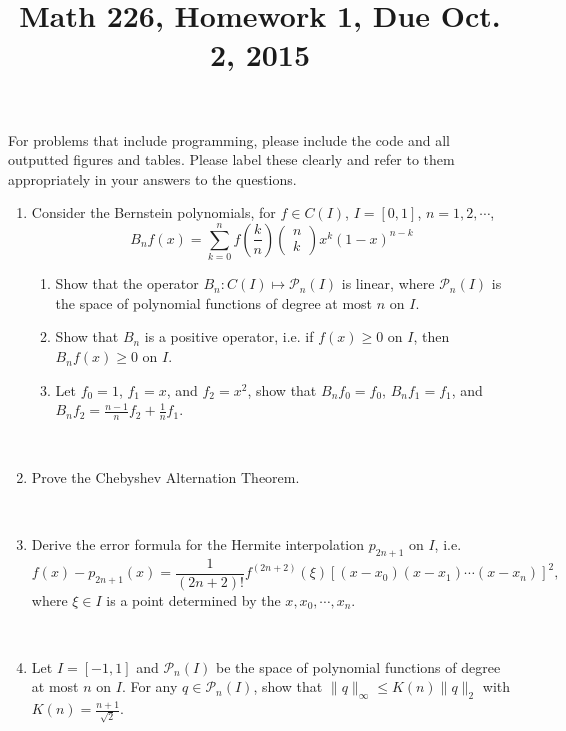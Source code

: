 \documentclass[12pt]{amsart}
\numberwithin{equation}{section}
\numberwithin{table}{section}
\numberwithin{figure}{section}
\numberwithin{algorithm}{section}
\begin{document}
\title[]{Math 226, Homework 1, Due Oct. 2, 2015}

\maketitle


For problems that include programming, please include the code and all outputted figures and tables.  Please label these clearly and refer to them appropriately in your answers to the questions.

\begin{enumerate}

\item Consider the Bernstein polynomials, for $f \in C(I)$, $I = [0,1]$, $n=1,2,\cdots$, 
$$
B_nf(x) = \sum_{k=0}^n f (\frac{k}{n}) 
\begin{pmatrix}
n \\
k
\end{pmatrix}
x^k(1-x)^{n-k}
$$
\begin{enumerate}
\item Show that the operator $B_n: C(I) \mapsto \mathcal{P}_n(I)$ is linear, where $\mathcal{P}_n(I)$ is the space of polynomial functions of degree at most $n$ on $I$.
\item Show that $B_n$ is a positive operator, i.e. if $f(x) \geq 0$ on $I$, then $B_nf(x)\geq 0$ on $I$.
\item Let $f_0 = 1$, $f_1 = x$, and $f_2 = x^2$, show that $B_nf_0 = f_0$, $B_nf_1 = f_1$, and $B_nf_2 = \frac{n-1}{n}f_2 + \frac{1}{n} f_1$.
\end{enumerate}

\

\item Prove the Chebyshev Alternation Theorem.

\

\item Derive the error formula for the Hermite interpolation $p_{2n+1}$ on $I$, i.e.
$$
f(x) - p_{2n+1}(x) =\frac{1}{(2n+2)!} f^{(2n+2)}(\xi) \left[(x-x_{0}) (x-x_{1}) \cdots (x-x_{n})\right]^2,
$$
where $\xi \in I$ is a point determined by the $x, x_0, \cdots, x_n$.

\

\item Let $I = [-1,1]$ and $\mathcal{P}_n(I)$ be the space of polynomial functions of degree at most $n$ on $I$. For any $q \in \mathcal{P}_n(I)$, show that $\| q \|_{\infty} \leq K(n) \| q \|_2$ with $K(n) = \frac{n+1}{\sqrt{2}}$.


\end{enumerate}
\end{document}
